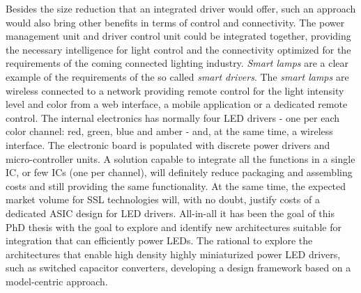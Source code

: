 Besides the size reduction that an integrated driver would offer, such an approach would also bring other benefits in terms of control and connectivity.  The power management unit and driver control unit could be integrated together, providing the necessary intelligence for light control and the connectivity optimized for the requirements of the coming connected lighting industry. \emph{Smart lamps} are a clear example of the requirements of the so called \emph{smart drivers}. The \emph{smart lamps} are wireless connected to a network providing remote control for the light intensity level and color from a web interface, a mobile application or a dedicated remote control. The internal electronics has normally four LED drivers - one per each color channel: red, green, blue and amber - and, at the same time, a wireless interface. The electronic board is populated with discrete power drivers and micro-controller units. A solution capable to integrate all the functions in a single IC, or few ICs (one per channel), will definitely reduce packaging and assembling costs and still providing the same functionality. At the same time, the expected market volume for SSL technologies will, with no doubt,  justify costs of a dedicated ASIC design for LED drivers. All-in-all it has been the goal of this PhD thesis with the goal to explore and identify new architectures suitable for  integration that can efficiently power LEDs. The rational to explore the architectures that enable high density highly miniaturized power LED drivers, such as switched capacitor converters, developing a design framework based on a model-centric approach.




 